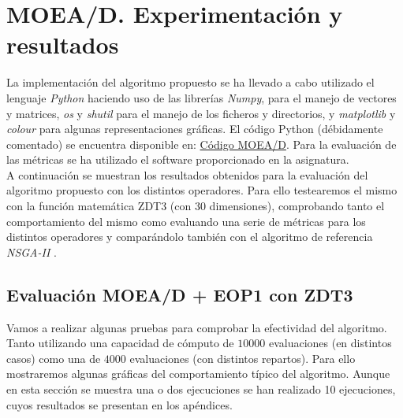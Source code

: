 \begin{minipage}[H]{0.5\linewidth}
\section{MOEA/D. Experimentación y resultados}
\justify

La implementación del algoritmo propuesto se ha llevado a cabo utilizado el lenguaje \textit{Python} haciendo uso de las librerías \textit{Numpy}, para el manejo de vectores y matrices, \textit{os} y \textit{shutil} para el manejo de los ficheros y directorios, y \textit{matplotlib} y \textit{colour} para algunas representaciones gráficas. El código Python (débidamente comentado) se encuentra disponible en: \href{https://github.com/vicramgon/EV_BIII.git}{\color{blue} Código MOEA/D}. Para la evaluación de las métricas se ha utilizado el software proporcionado en la asignatura. \\

A continuación se muestran los resultados obtenidos para la evaluación del algoritmo propuesto con los distintos operadores. Para ello testearemos el mismo con la función matemática ZDT3 (con 30 dimensiones)\cite{zdt3}, comprobando tanto el comportamiento del mismo como evaluando una serie de métricas para los distintos operadores y comparándolo también con el algoritmo de referencia \textit{NSGA-II} \cite{Deb2002}.\\

\subsection{Evaluación MOEA/D + EOP1 con ZDT3}

Vamos a realizar algunas pruebas para comprobar la efectividad del algoritmo. Tanto utilizando una capacidad de cómputo de $10000$ evaluaciones (en distintos casos) como una de $4000$ evaluaciones (con distintos repartos). Para ello mostraremos algunas gráficas del comportamiento típico del algoritmo. Aunque en esta sección se muestra una o dos ejecuciones se han realizado 10 ejecuciones, cuyos resultados se presentan en los apéndices.\\


\end{minipage} \hfill
